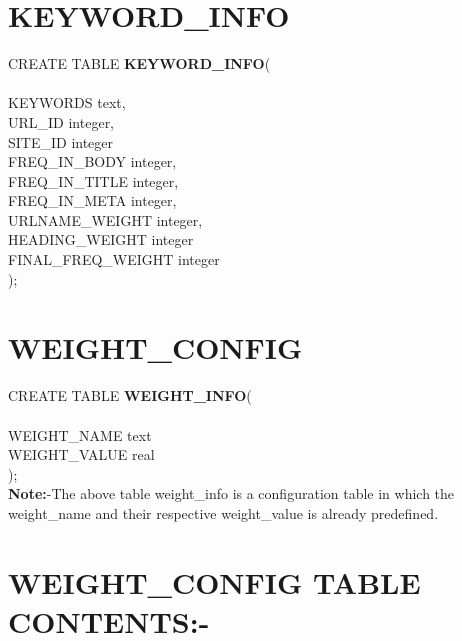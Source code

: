 \documentclass{scrreprt}
\begin{document}
\section{KEYWORD_INFO}

CREATE TABLE  \textbf{KEYWORD_INFO}( \\ \\
    KEYWORDS	       \hspace{15pt} 		text,\\
   
	URL_ID   	  \hspace{15pt}      		integer,\\
	SITE_ID   	     \hspace{15pt}   		integer \\
	
	FREQ_IN_BODY  \hspace{15pt}	 	integer,\\
	FREQ_IN_TITLE    \hspace{15pt}        	 	integer,\\
	FREQ_IN_META  \hspace{15pt}        integer,\\
    URLNAME_WEIGHT	      \hspace{15pt}      integer,\\
    HEADING_WEIGHT \hspace{15pt}	integer\\
    FINAL_FREQ_WEIGHT \hspace{15pt}	integer\\
  	);



\section{WEIGHT_CONFIG}
    CREATE TABLE  \textbf{WEIGHT_INFO}(\\ \\
    WEIGHT_NAME  	 \hspace{15pt}  	text\\
    WEIGHT_VALUE 	   \hspace{15pt}        		real\\
);\\

\textbf{Note:}-The above table weight_info is a configuration table  in which the weight_name and their respective weight_value is already  predefined.

\section{WEIGHT_CONFIG TABLE CONTENTS:-}
\end{document}
